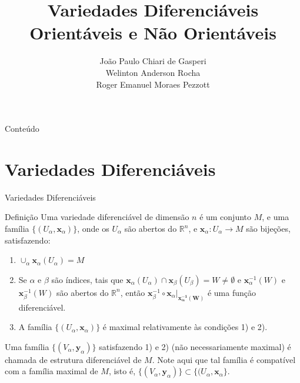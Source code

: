 \documentclass[aspectratio=169]{beamer}
\title{Variedades Diferenciáveis Orientáveis e Não Orientáveis}
\author{\Large
	João Paulo Chiari de Gasperi\\
	Welinton Anderson Rocha\\
	Roger Emanuel Moraes Pezzott\\
}
\date{}
\begin{document}
\begin{frame}[plain]
	\titlepage
\end{frame}

\begin{frame}{Conteúdo}
	\tableofcontents
\end{frame}


\section{Variedades Diferenciáveis}

\begin{frame}{Variedades Diferenciáveis}
	\begin{block}{Definição}
		Uma variedade diferenciável de dimensão $n$ é um conjunto $M$, e uma família $\{ (U_{\alpha}, \mathbf{x}_{\alpha}) \}$, onde os $U_{\alpha}$ são abertos do $\mathbb{R}^{n}$, e $\mathbf{x}_{\alpha}:U_{\alpha}\to M$ são bijeções, satisfazendo:
		\pause
		\begin{enumerate}
			\item $\cup_{\alpha} \mathbf{x}_{\alpha}(U_{\alpha})=M$
			      \pause
			\item Se $\alpha$ e $\beta$ são índices, tais que $\mathbf{x}_{\alpha}(U_{\alpha})\cap \mathbf{x}_{\beta}(U_{\beta}) = W \neq \emptyset$ e $\mathbf{x}^{-1}_{\alpha}(W)$ e $\mathbf{x}^{-1}_{\beta}(W)$ são abertos do $\mathbb{R}^{n}$, então $\mathbf{x}_{\beta}^{-1} \circ\mathbf{x}_{\alpha}|_{\mathbf{x_{\alpha}^{-1}(W)}}$ é uma função diferenciável.
			      \pause
			\item A família $\{ (U_{\alpha}, \mathbf{x}_{\alpha} )\}$ é maximal relativamente às condições 1) e 2).
		\end{enumerate}
		\pause

		Uma família $\{ (V_{\alpha}, \mathbf{y}_{\alpha}) \}$ satisfazendo 1) e 2) (não necessariamente maximal) é chamada de estrutura diferenciável de $M$. Note aqui que tal família é compatível com a família maximal de $M$, isto é, $\{ (V_{\alpha}, \mathbf{y}_{\alpha}) \} \subset\{ (U_{\alpha}, \mathbf{x}_{\alpha} \}$.
	\end{block}
\end{frame}
\end{document}
